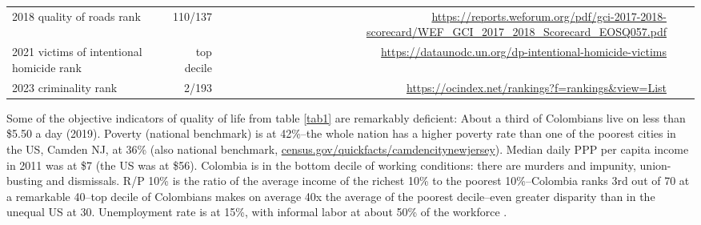 \documentclass[10pt, letterpaper]{article}
\begin{document}
\begin{spacing}{2}
\begin{table}[H]
\begin{tabular} {@{} lrrrr @{}}
2018 quality of roads rank& 110/137& {\tiny\url{https://reports.weforum.org/pdf/gci-2017-2018-scorecard/WEF_GCI_2017_2018_Scorecard_EOSQ057.pdf}} \\
2021 victims of intentional homicide rank&top decile& {\tiny\url{https://dataunodc.un.org/dp-intentional-homicide-victims}}\\
2023 criminality rank&2/193& {\tiny\url{https://ocindex.net/rankings?f=rankings&view=List}}\\\hline 
\end{tabular}\end{table}



  Some of the objective
 indicators of quality of life from table \ref{tab1} are remarkably deficient:   
  About a third of Colombians live on less than \$5.50 a day (2019).
 {Poverty (national benchmark) is at 42\%--the whole nation has a
   higher poverty rate than one of the poorest cities in the US, Camden NJ, at
   36\% (also national benchmark, \url{census.gov/quickfacts/camdencitynewjersey}).
    Median daily PPP per capita income in 2011 was at \$7 (the US was at \$56).}
  Colombia is in the bottom decile of working conditions: there are 
murders and impunity, union-busting and dismissals. %
%
  R/P 10\% is the ratio of the average income of the richest
  10\% to the poorest 10\%--Colombia ranks 3rd out of 70 at a remarkable 40--top
  decile of Colombians makes on average 40x the average of the poorest decile--even greater disparity than in the unequal US at 30. 
%
 Unemployment rate is at 15\%, 
with informal labor at about 50\% of the workforce
\citep[][]{hurtado2016socioeconomic}.


\end{spacing}
\end{document}
